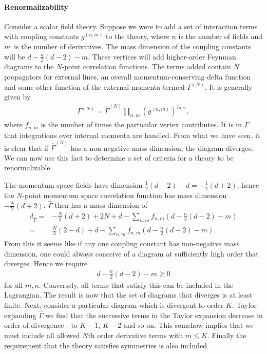 \paragraph{Renormalizability}
Consider a scalar field theory. Suppose we were to add a set of interaction terms with coupling constants $g^{(n, m)}$ to the theory, where $n$ is the number of fields and $m$ is the number of derivatives. The mass dimension of the coupling constants will be $d - \frac{n}{2}(d - 2) - m$. These vertices will add higher-order Feynman diagrams to the $N$-point correlation functions. The terms added contain $N$ propagators for external lines, an overall momentum-conserving delta function and some other function of the external momenta termed $\Gamma^{(N)}$. It is generally given by
\begin{align*}
	\Gamma^{(N)} = \hat{\Gamma}^{(N)}\prod\limits_{n, m}(g^{(n, m)})^{f_{n, m}},
\end{align*}
where $f_{n, m}$ is the number of times the particular vertex contributes. It is in $\hat{\Gamma}$ that integrations over internal momenta are handled. From what we have seen, it is clear that if $\hat{\Gamma}^{(N)}$ has a non-negative mass dimension, the diagram diverges. We can now use this fact to determine a set of criteria for a theory to be renormalizable. 

The momentum space fields have dimension $\frac{1}{2}(d - 2) - d = -\frac{1}{2}(d + 2)$, hence the $N$-point momentum space correlation function has mass dimension $-\frac{N}{2}(d + 2)$. $\hat{\Gamma}$ then has a mass dimension of
\begin{align*}
	d_{\hat{\Gamma}} =& -\frac{N}{2}(d + 2) + 2N + d - \sum\limits_{n, m}f_{n, m}\left(d - \frac{n}{2}(d - 2) - m\right) \\
	                 =& \frac{N}{2}(2 - d) + d - \sum\limits_{n, m}f_{n, m}\left(d - \frac{n}{2}(d - 2) - m\right).
\end{align*}
From this it seems like if any one coupling constant has non-negative mass dimension, one could always conceive of a diagram at sufficiently high order that diverges. Hence we require
\begin{align*}
	d - \frac{n}{2}(d - 2) - m \geq 0
\end{align*}
for all $m, n$. Conversely, all terms that satisfy this can be included in the Lagrangian. The result is now that the set of diagrams that diverges is at least finite. Next, consider a particular diagram which is divergent to order $K$. Taylor expanding $\hat{\Gamma}$ we find that the successive terms in the Taylor expansion decrease in order of divergence - to $K - 1$, $K - 2$ and so on. This somehow implies that we must include all allowed $N$th order derivative terms with $m \leq K$. Finally the requirement that the theory satisfies symmetries is also included.

